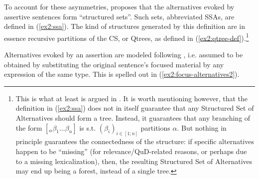 To account for these asymmetries, \textcite{Ippolito2019} proposes that the alternatives evoked by assertive sentences form ``structured sets''. Such sets, abbreviated SSAs, are defined in (\ref{ex2:ssa}). The kind of structures generated by this definition are in essence recursive partitions of the CS, or Qtrees, as defined in (\ref{ex2:qtree-def}).\footnote{This is what at least is argued in \textcite{Ippolito2019}. It is worth mentioning however, that the definition in (\ref{ex2:ssa}) does not in itself guarantee that any Structured Set of Alternatives should form a tree. Instead, it guarantees that any branching of the form $[_{\alpha} \beta_1 ... \beta_n]$ is s.t. $(\beta_i)_{i\in [1; n]}$ partitions $\alpha$. But nothing in principle guarantees the connectedness of the structure: if specific alternatives happen to be ``missing'' (for relevance/QuD-related reasons, or perhaps due to a missing lexicalization), then, the resulting Structured Set of Alternatives may end up being a forest, instead of a single tree.}

\begin{exe}
	\label{ex2:ssa}
\end{exe}

Alternatives evoked by an assertion are modeled following \textcite{Rooth1992}, i.e. assumed to be obtained by substituting the original sentence's focused material by any expression of the same type. This is spelled out in (\ref{ex2:focus-alternatives2}). 

